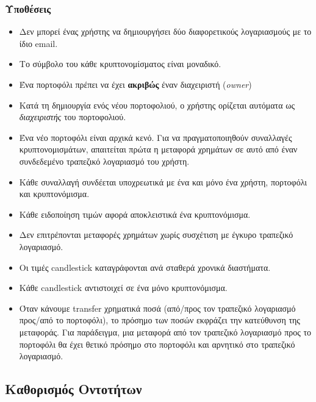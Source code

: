 \subsubsection*{Υποθέσεις}
\begin{itemize}
    \item Δεν μπορεί ένας χρήστης να δημιουργήσει δύο διαφορετικούς λογαριασμούς με το ίδιο 
    email.
    \item Το σύμβολο του κάθε κρυπτονομίσματος είναι μοναδικό.
    \item Ένα πορτοφόλι πρέπει να έχει \textbf{ακριβώς} έναν διαχειριστή (\textit{owner})
    \item Κατά τη δημιουργία ενός νέου πορτοφολιού, ο χρήστης ορίζεται αυτόματα ως 
    \textit{διαχειριστής} του πορτοφολιού.
    \item Ένα νέο πορτοφόλι είναι αρχικά κενό. Για να πραγματοποιηθούν συναλλαγές κρυπτονομισμάτων, 
    απαιτείται πρώτα η μεταφορά χρημάτων σε αυτό από έναν συνδεδεμένο τραπεζικό λογαριασμό του χρήστη.
    \item Κάθε συναλλαγή συνδέεται υποχρεωτικά με ένα και μόνο ένα χρήστη, πορτοφόλι και κρυπτονόμισμα. 
    \item Κάθε ειδοποίηση τιμών αφορά αποκλειστικά ένα κρυπτονόμισμα.
    \item Δεν επιτρέπονται μεταφορές χρημάτων χωρίς συσχέτιση με έγκυρο τραπεζικό λογαριασμό.
    \item Οι τιμές candlestick καταγράφονται ανά σταθερά 
    χρονικά διαστήματα.
    \item Κάθε candlestick αντιστοιχεί σε ένα μόνο κρυπτονόμισμα.
    \item Όταν κάνουμε transfer χρηματικά ποσά (από/προς τον τραπεζικό λογαριασμό προς/από το πορτοφόλι), το πρόσημο των ποσών εκφράζει την κατεύθυνση της μεταφοράς. Για παράδειγμα, μια μεταφορά από τον τραπεζικό λογαριασμό προς το πορτοφόλι θα έχει θετικό πρόσημο στο πορτοφόλι και αρνητικό στο τραπεζικό λογαριασμό.
\end{itemize}




\subsection{Καθορισμός Οντοτήτων}


